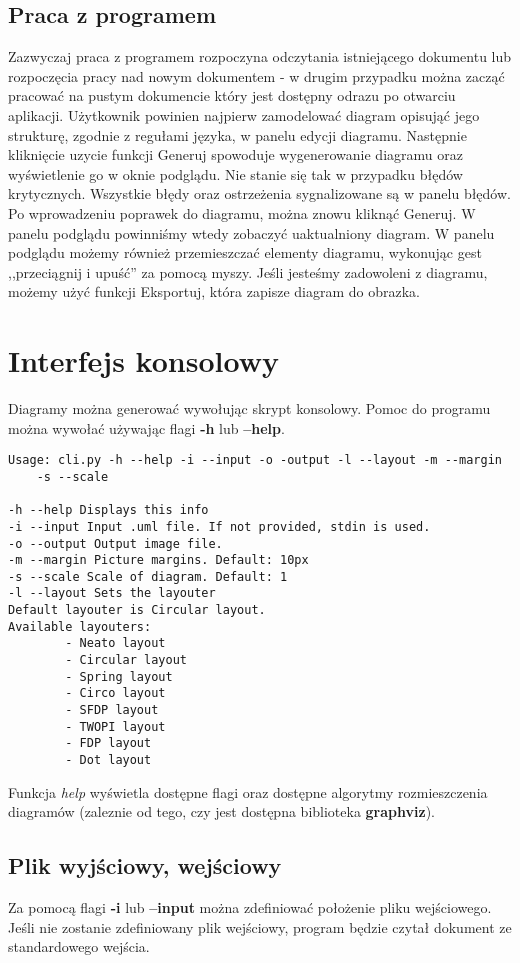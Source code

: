 \subsection{Praca z programem}

Zazwyczaj praca z programem rozpoczyna odczytania istniejącego dokumentu lub rozpoczęcia pracy nad nowym dokumentem - w drugim przypadku można zacząć pracować na pustym dokumencie który jest dostępny odrazu po otwarciu aplikacji. Użytkownik powinien najpierw zamodelować diagram opisująć jego strukturę, zgodnie z regułami języka, w panelu edycji diagramu. Następnie kliknięcie uzycie funkcji Generuj spowoduje wygenerowanie diagramu oraz wyświetlenie go w oknie podglądu. Nie stanie się tak w przypadku błędów krytycznych. Wszystkie błędy oraz ostrzeżenia sygnalizowane są w panelu błędów. Po wprowadzeniu poprawek do diagramu, można znowu kliknąć Generuj. W panelu podglądu powinniśmy wtedy zobaczyć uaktualniony diagram. W panelu podglądu możemy również przemieszczać elementy diagramu, wykonując gest ,,przeciągnij i upuść'' za pomocą myszy. Jeśli jesteśmy zadowoleni z diagramu, możemy użyć funkcji Eksportuj, która zapisze diagram do obrazka.

\section{Interfejs konsolowy}

Diagramy można generować wywołując skrypt konsolowy. Pomoc do programu można wywołać używając flagi \textbf{-h} lub \textbf{--help}.

\begin{lstlisting}
Usage: cli.py -h --help -i --input -o -output -l --layout -m --margin 
	-s --scale
	
-h --help Displays this info
-i --input Input .uml file. If not provided, stdin is used.
-o --output Output image file.
-m --margin Picture margins. Default: 10px
-s --scale Scale of diagram. Default: 1
-l --layout Sets the layouter
Default layouter is Circular layout.
Available layouters:
        - Neato layout
        - Circular layout
        - Spring layout
        - Circo layout
        - SFDP layout
        - TWOPI layout
        - FDP layout
        - Dot layout
\end{lstlisting}

Funkcja \emph{help} wyświetla dostępne flagi oraz dostępne algorytmy rozmieszczenia diagramów (zaleznie od tego, czy jest dostępna biblioteka \textbf{graphviz}).

\subsection{Plik wyjściowy, wejściowy}
Za pomocą flagi \textbf{-i} lub \textbf{--input} można zdefiniować położenie pliku wejściowego. Jeśli nie zostanie zdefiniowany plik wejściowy, program będzie czytał dokument ze standardowego wejścia.

